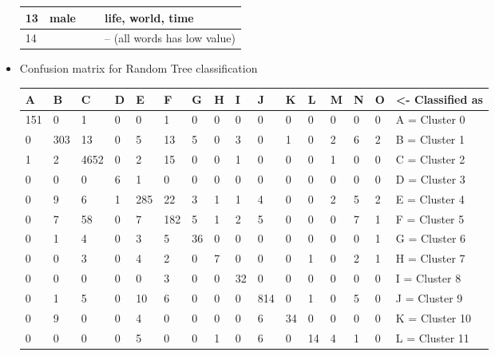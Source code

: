 \begin{itemize}
\begin{table}[H]
\begin{tabular}{|l|l|l|l|}
    13      & male   & ~                   & life,  world, time                             \\ \hline
    14      & ~      & ~                   & -- (all words has low value)                   \\ \hline
    \end{tabular}
	\end{table}
	\item Confusion matrix for Random Tree classification
	\begin{table}[H]
    \begin{tabular}{|l|l|l|l|l|l|l|l|l|l|l|l|l|l|l|l|}
    \hline
    A   & B   & C    & D & E   & F   & G  & H & I  & J   & K  & L  & M  & N  & O   & <- Classified as \\ \hline
    151 & 0   & 1    & 0 & 0   & 1   & 0  & 0 & 0  & 0   & 0  & 0  & 0  & 0  & 0   & A = Cluster 0    \\ \hline
    0   & 303 & 13   & 0 & 5   & 13  & 5  & 0 & 3  & 0   & 1  & 0  & 2  & 6  & 2   & B = Cluster 1    \\ \hline
    1   & 2   & 4652 & 0 & 2   & 15  & 0  & 0 & 1  & 0   & 0  & 0  & 1  & 0  & 0   & C = Cluster 2    \\ \hline
    0   & 0   & 0    & 6 & 1   & 0   & 0  & 0 & 0  & 0   & 0  & 0  & 0  & 0  & 0   & D = Cluster 3    \\ \hline
    0   & 9   & 6    & 1 & 285 & 22  & 3  & 1 & 1  & 4   & 0  & 0  & 2  & 5  & 2   & E = Cluster 4    \\ \hline
    0   & 7   & 58   & 0 & 7   & 182 & 5  & 1 & 2  & 5   & 0  & 0  & 0  & 7  & 1   & F = Cluster 5    \\ \hline
    0   & 1   & 4    & 0 & 3   & 5   & 36 & 0 & 0  & 0   & 0  & 0  & 0  & 0  & 1   & G = Cluster 6    \\ \hline
    0   & 0   & 3    & 0 & 4   & 2   & 0  & 7 & 0  & 0   & 0  & 1  & 0  & 2  & 1   & H = Cluster 7    \\ \hline
    0   & 0   & 0    & 0 & 0   & 3   & 0  & 0 & 32 & 0   & 0  & 0  & 0  & 0  & 0   & I = Cluster 8    \\ \hline
    0   & 1   & 5    & 0 & 10  & 6   & 0  & 0 & 0  & 814 & 0  & 1  & 0  & 5  & 0   & J = Cluster 9    \\ \hline
    0   & 9   & 0    & 0 & 4   & 0   & 0  & 0 & 0  & 6   & 34 & 0  & 0  & 0  & 0   & K = Cluster 10   \\ \hline
    0   & 0   & 0    & 0 & 5   & 0   & 0  & 1 & 0  & 6   & 0  & 14 & 4  & 1  & 0   & L = Cluster 11   \\ \hline

\end{tabular}
\end{table}
\end{itemize}

